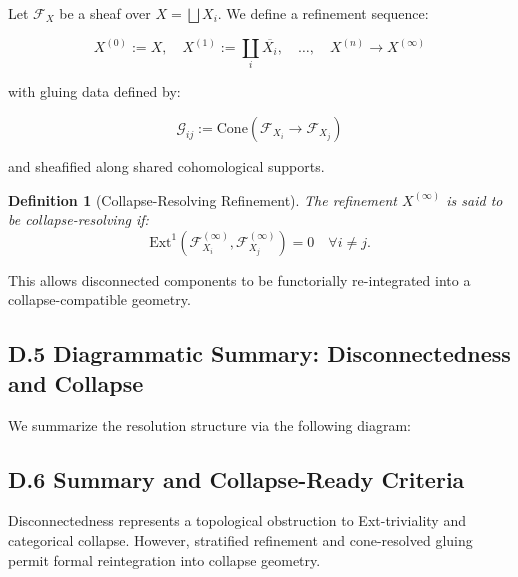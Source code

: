 \documentclass[11pt]{article}
\newtheorem{definition}[theorem]{Definition}
\begin{document}
Let \( \mathcal{F}_X \) be a sheaf over \( X = \bigsqcup X_i \). We define a refinement sequence:

\[
X^{(0)} := X, \quad X^{(1)} := \coprod_i \overline{X_i}, \quad \ldots, \quad X^{(n)} \to X^{(\infty)}
\]

with gluing data defined by:

\[
\mathcal{G}_{ij} := \mathrm{Cone}(\mathcal{F}_{X_i} \to \mathcal{F}_{X_j})
\]

and sheafified along shared cohomological supports.

\begin{definition}[Collapse-Resolving Refinement]
The refinement \( X^{(\infty)} \) is said to be \emph{collapse-resolving} if:
\[
\mathrm{Ext}^1(\mathcal{F}_{X_i}^{(\infty)}, \mathcal{F}_{X_j}^{(\infty)}) = 0 \quad \forall i \ne j.
\]
\end{definition}

This allows disconnected components to be functorially re-integrated into a collapse-compatible geometry.

\subsection*{D.5 Diagrammatic Summary: Disconnectedness and Collapse}

We summarize the resolution structure via the following diagram:



\subsection*{D.6 Summary and Collapse-Ready Criteria}

Disconnectedness represents a topological obstruction to Ext-triviality and categorical collapse.  
However, stratified refinement and cone-resolved gluing permit formal reintegration into collapse geometry.
\end{document}
